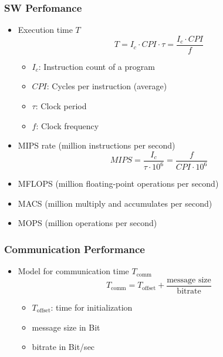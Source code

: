 \subsubsection{SW Perfomance}
\begin{itemize}
	\item Execution time $T$
$$
	T = I_c \cdot CPI \cdot \tau = \frac{I_c\cdot CPI}{f}
$$
	\begin{itemize}
	\item $I_c$: Instruction count of a program
	\item $CPI$: Cycles per instruction (average)
	\item $\tau$: Clock period
	\item $f$: Clock frequency
\end{itemize}
	\item MIPS rate (million instructions per second)
$$
	MIPS = \frac{I_c}{\tau\cdot10^6} = \frac{f}{CPI\cdot10^6}
$$
	\item MFLOPS (million floating-point operations per second)
	\item MACS (million multiply and accumulates per second)
	\item MOPS (million operations per second)
\end{itemize}

\subsubsection{Communication Performance}
\begin{itemize}
	\item Model for communication time $T_{\text{comm}}$
$$
	T_{\text{comm}} = T_{\text{offset}} + \frac{\text{message size}}{\text{bitrate}}
$$
\begin{itemize}
	\item $T_{\text{offset}}$: time for initialization
	\item message size in Bit
	\item bitrate in Bit/sec
\end{itemize}
\end{itemize}

